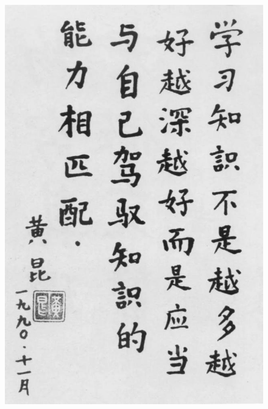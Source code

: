 \frame
{
	\frametitle{}
\begin{figure}[h!]
\centering
\vspace{-5.5pt}
\includegraphics[height=0.65\textwidth]{Figures/Quote-Huang_Kun.jpg}
\caption{\fontsize{6.2pt}{5.2pt}\selectfont{黄昆~教授的治学名言}}
\label{Quote-Huang_Kun}
\end{figure}
}
		\frame[allowframebreaks]
